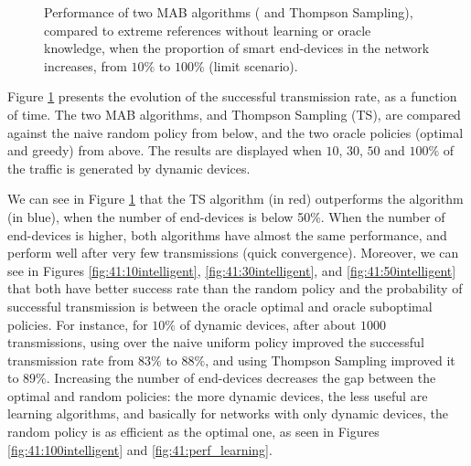 \begin{figure}[!t]
{    \label{fig:41:50intelligent}}
    \hfill
    \caption{Performance of two MAB algorithms (\UCB{} and Thompson Sampling), compared to extreme references without learning or oracle knowledge, when the proportion of smart end-devices in the network increases, from $10\%$ to $100\%$ (limit scenario).}
    \label{fig:41:from10to100}
    \vspace*{-10pt}
\end{figure}


Figure \ref{fig:41:from10to100} presents the evolution of the successful transmission rate, as a function of time.
The two MAB algorithms, \UCB{} and Thompson Sampling (TS), are compared against the naive random policy from below, and the two oracle policies (optimal and greedy) from above.
The results are displayed when $10$, $30$, $50$ and $100\%$ of the traffic is generated by dynamic devices.


We can see in Figure \ref{fig:41:from10to100} that the TS algorithm (in red) outperforms the \UCB{} algorithm (in blue), when the number of end-devices is below 50\%. When the number of end-devices is higher, both algorithms have almost the same performance, and perform well after very few transmissions (quick convergence).
Moreover, we can see in Figures \ref{fig:41:10intelligent}, \ref{fig:41:30intelligent}, and \ref{fig:41:50intelligent} that both have better success rate than the random policy and the probability of successful transmission is between the oracle optimal and oracle suboptimal policies.
For instance, for $10\%$ of dynamic devices, after about $1000$ transmissions, using \UCB{} over the naive uniform policy improved the successful transmission rate from $83\%$ to $88\%$, and using Thompson Sampling improved it to $89\%$.
Increasing the number of end-devices decreases the gap between the optimal and random policies: the more dynamic devices, the less useful are learning algorithms, and basically for networks with only dynamic devices, the random policy is as efficient as the optimal one, as seen in Figures \ref{fig:41:100intelligent} and \ref{fig:41:perf_learning}.

